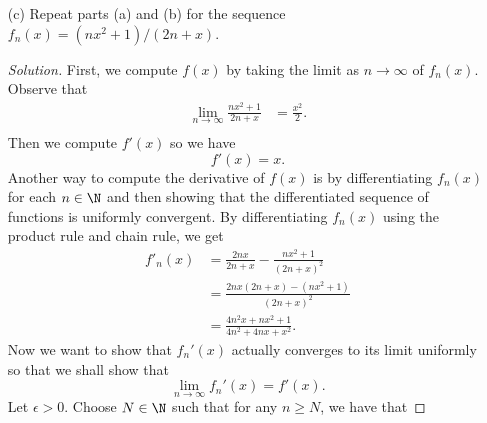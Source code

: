 \begin{enumerate}
\begin{proof}[Solution]
        To show that \( (g_n') \) converges uniformly on every interval \( [-M, M ] \), we need to show that \( (g_n')  \) satisfies the Cauchy Criterion. Let \( \epsilon > 0  \). Choose \( N = 1 / \epsilon    \) such that for any \( n \geq N  \) and for any \( x \in [-M,M] \), we have 
        \begin{align*}
            | g_n'(x) - g'(x)  | &= \Big| \frac{ 1 }{ 2 } + \frac{ x }{ n } - \frac{ 1 }{ 2 }  \Big| \\
                                 &= \Big| \frac{ x }{ n }  \Big| \\
                                 &\leq \frac{ M  }{ n } \\
                                 &< M \cdot \frac{ \epsilon  }{ M } = \epsilon.
        \end{align*}
        Since our choice of \( N  \) only depends on \( \epsilon  \), we know that \( (g_n') \to g' \) uniformly.
        \end{proof}
    \item[(c)] Repeat parts (a) and (b) for the sequence \( f_n(x) = (nx^2+1) / (2n+x) \).
        \begin{proof}[Solution]
        First, we compute \( f(x)  \) by taking the limit as \( n \to \infty  \) of \( f_n(x) \). Observe that
        \begin{align*}
            \lim_{ n \to \infty  } \frac{ nx^2+1 }{ 2n+x } &= \frac{ x^2 }{ 2 }.  \\
        \end{align*}
        Then we compute \( f'(x) \) so we have 
        \[  f'(x) = x. \]
        Another way to compute the derivative of \( f(x)  \) is by differentiating \( f_n(x)  \) for each \( n \in \N  \) and then showing that the differentiated sequence of functions is uniformly convergent. By differentiating \( f_n(x)  \) using the product rule and chain rule, we get
        \begin{align*} 
            f'_n(x) &= \frac{ 2nx }{ 2n + x  } - \frac{ nx^2 + 1  }{ (2n + x)^2 }  \\
                    &= \frac{ 2nx(2n+x) - (nx^2+1) }{ (2n+x)^2 } \\ 
                    &= \frac{  4n^2x + nx^2 + 1  }{ 4n^2 + 4nx + x^2}.
        \end{align*}
        Now we want to show that \( f_n'(x)  \) actually converges to its limit uniformly so that we shall show that 
        \[  \lim_{ n \to \infty  } f_n'(x) = f'(x). \]
        Let \( \epsilon > 0  \). Choose \( N \in \N  \) such that for any \( n \geq N  \), we have that 

\end{proof}
\end{enumerate}
